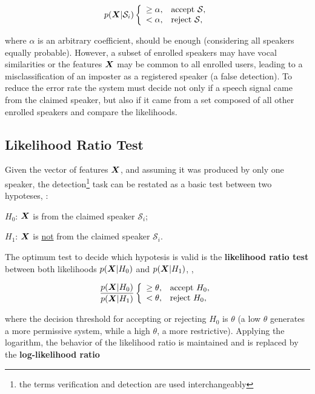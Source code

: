 \begin{equation}
    \postpdf{\boldsymbol{X}}{\mathcal{S}_i} \verifytestB{\alpha}{\mathcal{S}}
    \label{eq:decision_speaker_verification}
\end{equation}

\noindent where $\alpha$ is an arbitrary coefficient, should be enough (considering all speakers equally probable). However, a subset of enrolled speakers may have vocal similarities or the features $\boldsymbol{X}$ may be common to all enrolled users, leading to a misclassification of an imposter as a registered speaker (a false detection). To reduce the error rate the system must decide not only if a speech signal came from the claimed speaker, but also if it came from a set composed of all other enrolled speakers and compare the likelihoods.

\subsection{Likelihood Ratio Test}

Given the vector of features $\boldsymbol{X}$, and assuming it was produced by only one speaker, the detection\footnote{the terms verification and detection are used interchangeably} task can be restated as a basic test between two hypoteses, :

\begin{description}\itemsep0pt
    \item $H_0$: $\boldsymbol{X}$ is from the claimed speaker $\mathcal{S}_i$;
    \item $H_1$: $\boldsymbol{X}$ is \underline{not} from the claimed speaker $\mathcal{S}_i$.
\end{description}

\noindent The optimum test to decide which hypotesis is valid is the \textbf{likelihood ratio test} between both likelihoods $p(\boldsymbol{X}|H_0)$ and $p(\boldsymbol{X}|H_1)$, ,

\begin{equation}
    \frac{\postpdf{\dvec{X}}{H_0}}{\postpdf{\dvec{X}}{H_1}} \verifytestB{\theta}{H_0}
    \label{eq:likelihood-ratio-test}
\end{equation}

\noindent where the decision threshold for accepting or rejecting $H_0$ is $\theta$ (a low $\theta$ generates a more permissive system, while a high $\theta$, a more restrictive). Applying the logarithm, the behavior of the likelihood ratio is maintained and  is replaced by the \textbf{log-likelihood ratio}

